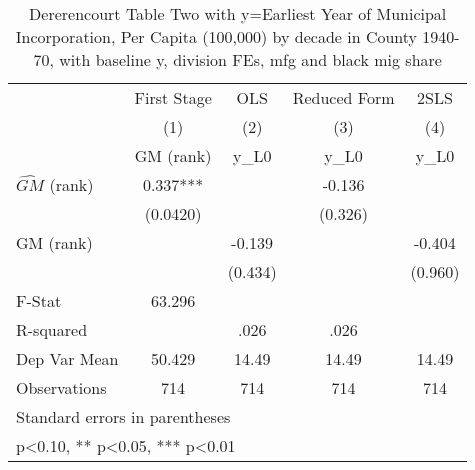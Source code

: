 \begin{table}[htbp]\centering
\def\sym#1{\ifmmode^{#1}\else\(^{#1}\)\fi}
\caption{Dererencourt Table Two with y=Earliest Year of Municipal Incorporation, Per Capita (100,000) by decade in County 1940-70, with baseline y, division FEs, mfg and black mig share}
\begin{tabular}{l*{4}{c}}
\toprule
                    & First Stage   &         OLS   &Reduced Form   &        2SLS   \\
                    &\multicolumn{1}{c}{(1)}&\multicolumn{1}{c}{(2)}&\multicolumn{1}{c}{(3)}&\multicolumn{1}{c}{(4)}\\
                    &\multicolumn{1}{c}{GM  (rank)}&\multicolumn{1}{c}{y\_L0}&\multicolumn{1}{c}{y\_L0}&\multicolumn{1}{c}{y\_L0}\\
\midrule
$\hat{GM}$ (rank)   &       0.337***&               &      -0.136   &               \\
                    &    (0.0420)   &               &     (0.326)   &               \\
\addlinespace
GM  (rank)          &               &      -0.139   &               &      -0.404   \\
                    &               &     (0.434)   &               &     (0.960)   \\
\midrule
F-Stat              &      63.296   &               &               &               \\
R-squared           &               &        .026   &        .026   &               \\
Dep Var Mean        &      50.429   &       14.49   &       14.49   &       14.49   \\
Observations        &         714   &         714   &         714   &         714   \\
\bottomrule
\multicolumn{5}{l}{\footnotesize Standard errors in parentheses}\\
\multicolumn{5}{l}{\footnotesize * p<0.10, ** p<0.05, *** p<0.01}\\
\end{tabular}
\end{table}
